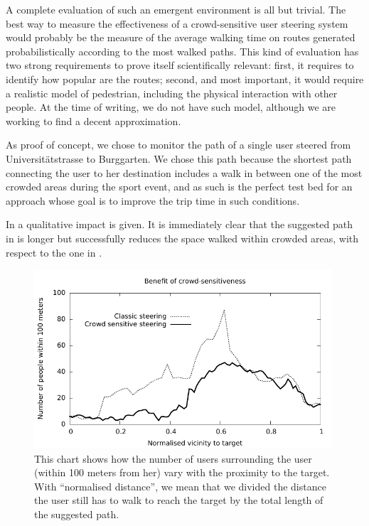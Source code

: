\documentclass[12pt,a4paper,twoside,openright]{book}
\begin{document}
A complete evaluation of such an emergent environment is all but trivial.
%
The best way to measure the effectiveness of a crowd-sensitive user steering system would probably be the measure of the average walking time on routes generated probabilistically according to the most walked paths.
%
This kind of evaluation has two strong requirements to prove itself scientifically relevant: first, it requires to identify how popular are the routes; second, and most important, it would require a realistic model of pedestrian, including the physical interaction with other people.
%
At the time of writing, we do not have such model, although we are working to find a decent approximation.

As proof of concept, we chose to monitor the path of a single user steered from Universit\"{a}tstrasse to Burggarten.
%
We chose this path because the shortest path connecting the user to her destination includes a walk in between one of the most crowded areas during the sport event, and as such is the perfect test bed for an approach whose goal is to improve the trip time in such conditions.

In  a qualitative impact is given.
%
It is immediately clear that the suggested path in  is longer but successfully reduces the space walked within crowded areas, with respect to the one in .

\begin{figure}
 \includegraphics[width=0.99\textwidth]{img/ahpc-chart}
 \caption{This chart shows how the number of users surrounding the user (within 100 meters from her) vary with the proximity to the target.
%
 With ``normalised distance'', we mean that we divided the distance the user still has to walk to reach the target by the total length of the suggested path.
 }
 \label{img:ahpc-chart}
\end{figure}
\end{document}
